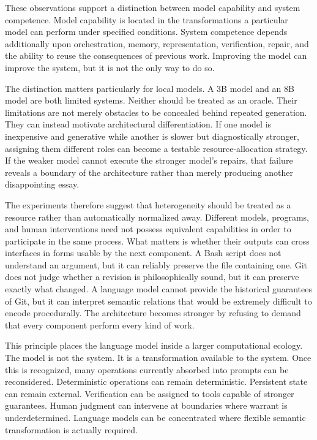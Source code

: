 \documentclass[11pt]{article}
\begin{document}
These observations support a distinction between model capability and system competence. Model capability is located in the transformations a particular model can perform under specified conditions. System competence depends additionally upon orchestration, memory, representation, verification, repair, and the ability to reuse the consequences of previous work. Improving the model can improve the system, but it is not the only way to do so.

The distinction matters particularly for local models. A 3B model and an 8B model are both limited systems. Neither should be treated as an oracle. Their limitations are not merely obstacles to be concealed behind repeated generation. They can instead motivate architectural differentiation. If one model is inexpensive and generative while another is slower but diagnostically stronger, assigning them different roles can become a testable resource-allocation strategy. If the weaker model cannot execute the stronger model's repairs, that failure reveals a boundary of the architecture rather than merely producing another disappointing essay.

The experiments therefore suggest that heterogeneity should be treated as a resource rather than automatically normalized away. Different models, programs, and human interventions need not possess equivalent capabilities in order to participate in the same process. What matters is whether their outputs can cross interfaces in forms usable by the next component. A Bash script does not understand an argument, but it can reliably preserve the file containing one. Git does not judge whether a revision is philosophically sound, but it can preserve exactly what changed. A language model cannot provide the historical guarantees of Git, but it can interpret semantic relations that would be extremely difficult to encode procedurally. The architecture becomes stronger by refusing to demand that every component perform every kind of work.

This principle places the language model inside a larger computational ecology. The model is not the system. It is a transformation available to the system. Once this is recognized, many operations currently absorbed into prompts can be reconsidered. Deterministic operations can remain deterministic. Persistent state can remain external. Verification can be assigned to tools capable of stronger guarantees. Human judgment can intervene at boundaries where warrant is underdetermined. Language models can be concentrated where flexible semantic transformation is actually required.
\end{document}
